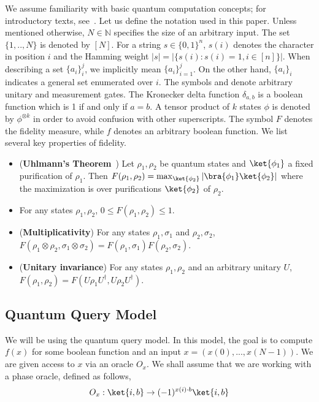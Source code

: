 We assume familiarity with basic quantum computation concepts; for introductory texts, see~\cite{Nielsen_Chuang, watrous_lecture_notes}.
Let us define the notation used in this paper. Unless mentioned otherwise, $N\in \mathbb{N}$ specifies the size of an arbitrary input. The set $\{1,..,N\}$ is denoted by $[N]$. For a string $s\in \{0,1\}^n$, $s(i)$ denotes the character in position $i$ and the Hamming weight $|s| = |\{s(i): s(i)=1, i\in [n]\}|$. When describing a set $\{a_i\}_i^j$, we implicitly mean $\{a_i\}_{i=1}^j$. On the other hand, $\{a_i\}_i$ indicates a general set enumerated over $i$. The symbols \unitarygate{} and \measurementgate{} denote arbitrary unitary and measurement gates. The Kronecker delta function $\delta_{a,b}$ is a boolean function which is 1 if and only if $a=b$.
A tensor product of $k$ states $\phi$ is denoted by $\phi^{\otimes k}$ in order to avoid confusion with other superscripts.
The symbol $F$ denotes the fidelity measure, while $f$ denotes an arbitrary boolean function. We list several key properties of fidelity.

\begin{itemize}
    \item (\textbf{Uhlmann's Theorem}~\cite{uhlmann_theorem}) Let $\rho_1, \rho_2$ be quantum states and $\ket{\phi_1}$ a fixed purification of $\rho_1$. Then $F(\rho_1, \rho_2) = \max_{\ket{\phi_2}}  \left| \bra{\phi_1}\ket{\phi_2} \right|$ where the maximization is over purifications $\ket{\phi_2}$ of $\rho_2$.
    \item For any states $\rho_1, \rho_2$, $0\leq F(\rho_1, \rho_2)\leq 1$.
    \item (\textbf{Multiplicativity}) For any states $\rho_1, \sigma_1$ and $\rho_2, \sigma_2$, $F(\rho_1\otimes \rho_2, \sigma_1 \otimes \sigma_2 ) = F(\rho_1,\sigma_1 )F(\rho_2,\sigma_2 )$.
    \item (\textbf{Unitary invariance}) For any states $\rho_1, \rho_2$ and an arbitrary unitary $U$, $F(\rho_1, \rho_2) = F(U \rho_1 U^\dagger, U \rho_2 U^\dagger )$.
\end{itemize}

\subsection{Quantum Query Model}

We will be using the quantum query model. In this model, the goal is to compute $f(x)$ for some boolean function and an input $x = (x(0), ...,x(N-1))$. We are given access to $x$ via an oracle $O_x$. We shall assume that we are working with a phase oracle, defined as follows,
\begin{align*}
    O_x: \ket{i,b} \rightarrow (-1)^{x(i)\cdot b}\ket{i,b}
\end{align*}

